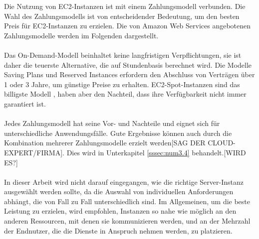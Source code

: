 Die Nutzung von EC2-Instanzen ist mit einem Zahlungsmodell verbunden. Die Wahl des Zahlungsmodells ist von entscheidender Bedeutung, um den besten Preis für EC2-Instanzen zu erzielen.
Die von Amazon Web Services angebotenen Zahlungsmodelle werden im Folgenden dargestellt.
\\\\
Das On-Demand-Modell  %
beinhaltet keine langfristigen Verpflichtungen, sie ist daher die teuerste Alternative, die auf Stundenbasis berechnet wird. Die Modelle Saving Plans und Reserved Instances erfordern den Abschluss von Verträgen über 1 oder 3 Jahre, um günstige Preise zu erhalten. EC2-Spot-Instanzen sind das billigste Modell , haben aber den Nachteil, dass ihre Verfügbarkeit nicht immer garantiert ist.
\\\\
Jedes Zahlungsmodell hat seine Vor- und Nachteile und eignet sich für unterschiedliche Anwendungsfälle. Gute Ergebnisse können auch durch die Kombination mehrerer Zahlungsmodelle erzielt werden[SAG DER CLOUD-EXPERT/FIRMA]. Dies wird in Unterkapitel \ref{sssec:num3.4} behandelt.[WIRD ES?]
\\\\
In dieser Arbeit wird nicht darauf eingegangen, wie die richtige Server-Instanz ausgewählt werden sollte, da die Auswahl von individuellen Anforderungen abhängt, die von Fall zu Fall unterschiedlich sind. Im Allgemeinen, um die beste Leistung zu erzielen, wird empfohlen, Instanzen so nahe wie möglich an den anderen Ressourcen, mit denen sie kommunizieren werden, und an der Mehrzahl der Endnutzer, die die Dienste in Anspruch nehmen werden, zu platzieren.

